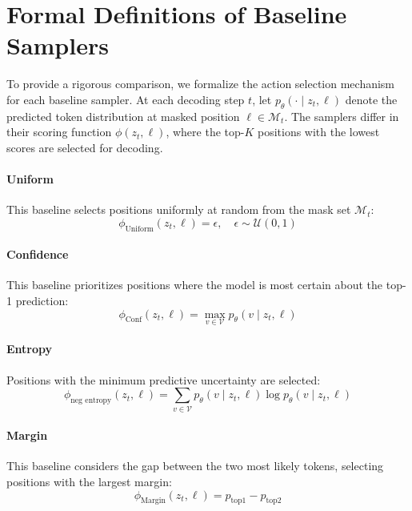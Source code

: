 \appendix

\section{Formal Definitions of Baseline Samplers}
\label{appendix:baselines}

To provide a rigorous comparison, we formalize the action selection mechanism for each baseline sampler. At each decoding step $t$, let $p_\theta(\cdot \mid z_t, \ell)$ denote the predicted token distribution at masked position $\ell \in \mathcal{M}_t$. The samplers differ in their scoring function $\phi(z_t, \ell)$, where the top-$K$ positions with the lowest scores are selected for decoding.

\paragraph{Uniform~\cite{nie2025large}} This baseline selects positions uniformly at random from the mask set $\mathcal{M}_t$:
\begin{equation}
    \phi_{\text{Uniform}}(z_t, \ell) = \epsilon, \quad \epsilon \sim \mathcal{U}(0, 1)
\end{equation}

\paragraph{Confidence~\cite{chang2022maskgit}} This baseline prioritizes positions where the model is most certain about the top-1 prediction:
\begin{equation}
    \phi_{\text{Conf}}(z_t, \ell) = \max_{v \in \mathcal{V}} p_\theta(v \mid z_t, \ell)
\end{equation}

\paragraph{Entropy~\cite{ye2025dream}} Positions with the minimum predictive uncertainty are selected:
\begin{equation}
    \phi_{\text{neg entropy}}(z_t, \ell) = \sum_{v \in \mathcal{V}} p_\theta(v \mid z_t, \ell) \log p_\theta(v \mid z_t, \ell)
\end{equation}

\paragraph{Margin~\cite{kim2025train}} This baseline considers the gap between the two most likely tokens, selecting positions with the largest margin:
\begin{equation}
    \phi_{\text{Margin}}(z_t, \ell) = p_{\text{top1}} - p_{\text{top2}}
\end{equation}

